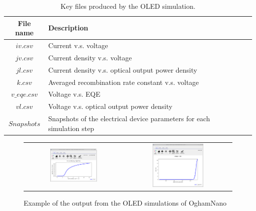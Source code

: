 \begin{table}[H]
\begin{center}
\begin{tabular}{ |c|l|c| } 
 \hline
	File name 			& 	Description  \\ 
 \hline
	$iv.csv$			&	Current v.s. voltage \\ 
	$jv.csv$			&	Current density v.s. voltage \\
	$jl.csv$			&	Current density v.s. optical output power density \\
	$k.csv$				&	Averaged recombination rate constant v.s. voltage \\
 	$v\_eqe.csv$		&	Voltage v.s. EQE\\
 	$vl.csv$			&	Voltage v.s. optical output power density\\
 	$Snapshots$			&	Snapshots of the electrical device parameters for each simulation step\\
 \hline
\end{tabular}
\caption{Key files produced by the OLED simulation.}
\label{tab:oled_output}
\end{center}
\end{table}

\begin{figure}[H]
\centering
\begin{tabular}{ c c }

\includegraphics[width=0.5\textwidth,height=0.4\textwidth]{./images/oled/i_l.png}

&
\includegraphics[width=0.5\textwidth,height=0.4\textwidth]{./images/oled/v_eqe.png}

\\
\end{tabular}
\caption{Example of the output from the OLED simulations of OghamNano}
\label{fig:li_and_eqe_curves}
\end{figure}

